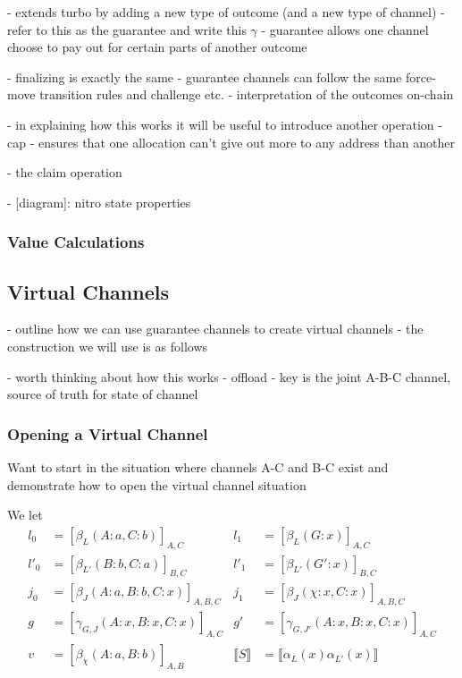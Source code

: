 \documentclass{article}
\theoremstyle{definition}
\newcommand{\adj}[1]{\llbracket #1 \rrbracket}
\newcommand{\enf}[1]{[#1]}
\begin{document}
- extends turbo by adding a new type of outcome (and a new type of channel)
- refer to this as the guarantee and write this $\gamma$
- guarantee allows one channel choose to pay out for certain parts of another outcome

- finalizing is exactly the same
- guarantee channels can follow the same force-move transition rules and challenge etc.
- interpretation of the outcomes on-chain

- in explaining how this works it will be useful to introduce another operation
- cap - ensures that one allocation can't give out more to any address than another



- the claim operation




- [diagram]: nitro state properties


\subsubsection{Value Calculations}

\subsection{Virtual Channels}

- outline how we can use guarantee channels to create virtual channels
- the construction we will use is as follows



- worth thinking about how this works
- offload
- key is the joint A-B-C channel, source of truth for state of channel


\subsubsection{Opening a Virtual Channel}

Want to start in the situation where channels A-C and B-C exist and demonstrate how to
open the virtual channel situation

We let
\begin{align*}
l_0 &= \enf{\beta_L(A:a, C: b)}_{A, C} &
l_1 &= \enf{\beta_L(G: x)}_{A, C} \\
l'_0 &= \enf{\beta_{L'}(B:b, C: a)}_{B, C} &
l'_1 &= \enf{\beta_{L'}(G': x)}_{B, C} \\
j_0 &= \enf{\beta_{J}(A: a, B:b, C: x)}_{A, B, C} &
j_1 &= \enf{\beta_{J}(\chi: x, C: x)}_{A, B, C} \\
g &= \enf{\gamma_{G, J}(A: x, B:x, C: x)}_{A, C} &
g' &= \enf{\gamma_{G, J'}(A: x, B:x, C: x)}_{A, C} \\
v &= \enf{\beta_\chi(A: a, B: b)}_{A, B} &
\adj{S} &= \adj{\alpha_L(x)\alpha_{L'}(x)}
\end{align*}
\end{document}
